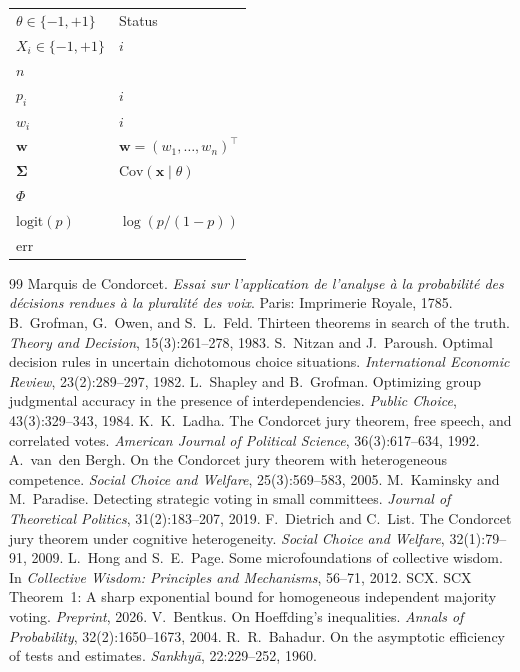 \documentclass[11pt,a4paper]{article}
\newcommand{\Cov}{\mathrm{Cov}}
\newcommand{\logit}{\mathrm{logit}}
\newcommand{\err}{\mathrm{err}}
\newcommand{\wv}{\mathbf{w}}
\newcommand{\xv}{\mathbf{x}}
\newcommand{\Sigmav}{\mathbf{\Sigma}}
\begin{document}
\section{}
\renewcommand{\arraystretch}{1.3}
\begin{tabular}{ll}
 \toprule
 \midrule
 $\theta \in \{-1,+1\}$ & Status \\
 $X_i \in \{-1,+1\}$ & $i$ \\
 $n$ & \\
 $p_i$ & $i$ \\
 $w_i$ & $i$ \\
 $\wv$ & $\wv = (w_1,\ldots,w_n)^\top$ \\
 $\Sigmav$ & $\Cov(\xv \mid \theta)$ \\
 $\Phi$ & \\
 $\logit(p)$ & $\log(p/(1-p))$ \\
 $\err$ & \\
 \bottomrule
\end{tabular}
\begin{thebibliography}{99}
Marquis de Condorcet.
\textit{Essai sur l'application de l'analyse \`a la probabilit\'e des d\'ecisions rendues \`a la pluralit\'e des voix}.
Paris: Imprimerie Royale, 1785.
B.~Grofman, G.~Owen, and S.~L.~Feld.
Thirteen theorems in search of the truth.
\textit{Theory and Decision}, 15(3):261--278, 1983.
S.~Nitzan and J.~Paroush.
Optimal decision rules in uncertain dichotomous choice situations.
\textit{International Economic Review}, 23(2):289--297, 1982.
L.~Shapley and B.~Grofman.
Optimizing group judgmental accuracy in the presence of interdependencies.
\textit{Public Choice}, 43(3):329--343, 1984.
K.~K.~Ladha.
The Condorcet jury theorem, free speech, and correlated votes.
\textit{American Journal of Political Science}, 36(3):617--634, 1992.
A.~van~den Bergh.
On the Condorcet jury theorem with heterogeneous competence.
\textit{Social Choice and Welfare}, 25(3):569--583, 2005.
M.~Kaminsky and M.~Paradise.
Detecting strategic voting in small committees.
\textit{Journal of Theoretical Politics}, 31(2):183--207, 2019.
F.~Dietrich and C.~List.
The Condorcet jury theorem under cognitive heterogeneity.
\textit{Social Choice and Welfare}, 32(1):79--91, 2009.
L.~Hong and S.~E.~Page.
Some microfoundations of collective wisdom.
In \textit{Collective Wisdom: Principles and Mechanisms}, 56--71, 2012.
SCX.
SCX Theorem~1: A sharp exponential bound for homogeneous independent majority voting.
\textit{Preprint}, 2026.
V.~Bentkus.
On Hoeffding's inequalities.
\textit{Annals of Probability}, 32(2):1650--1673, 2004.
R.~R.~Bahadur.
On the asymptotic efficiency of tests and estimates.
\textit{Sankhy\=a}, 22:229--252, 1960.
\end{thebibliography}
\end{document}
